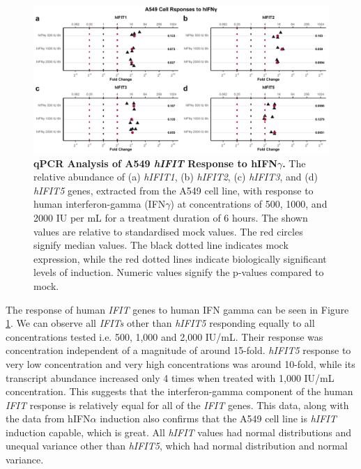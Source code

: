 \begin{figure}
    \centering
    \includegraphics[width=1\linewidth]{06. Chapter 1/Figs/01. Induction/02. a549_treat_ifng.pdf}
    \caption[qPCR Analysis of A549 \textit{hIFIT} Response to hIFN\(\gamma\).]{\textbf{qPCR Analysis of A549 \textit{hIFIT} Response to hIFN\(\gamma\).} The relative abundance of (a) \textit{hIFIT1}, (b) \textit{hIFIT2}, (c) \textit{hIFIT3}, and (d) \textit{hIFIT5} genes, extracted from the A549 cell line, with response to human interferon-gamma (IFN\(\gamma\)) at concentrations of 500, 1000, and 2000 IU per mL for a treatment duration of 6 hours. The shown values are relative to standardised mock values. The red circles signify median values. The black dotted line indicates mock expression, while the red dotted lines indicate biologically significant levels of induction. Numeric values signify the p-values compared to mock.}
    \label{A549 Response to hIFNg}
\end{figure}

The response of human \textit{IFIT} genes to human IFN gamma can be seen in Figure \ref{A549 Response to hIFNg}. We can observe all \textit{IFITs} other than \textit{hIFIT5} responding equally to all concentrations tested i.e. 500, 1,000 and 2,000 IU/mL. Their response was concentration independent of a magnitude of around 15-fold. \textit{hIFIT5} response to very low concentration and very high concentrations was around 10-fold, while its transcript abundance increased only 4 times when treated with 1,000 IU/mL concentration. This suggests that the interferon-gamma component of the human \textit{IFIT} response is relatively equal for all of the \textit{IFIT} genes. This data, along with the data from hIFN\(\alpha\) induction also confirms that the A549 cell line is \textit{hIFIT} induction capable, which is great. All \textit{hIFIT} values had normal distributions and unequal variance other than \textit{hIFIT5}, which had normal distribution and normal variance.


